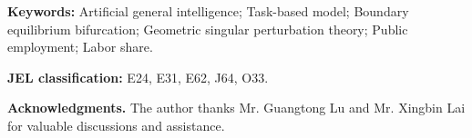 \documentclass[11pt]{article}
\begin{document}
\noindent\textbf{Keywords:} Artificial general intelligence; Task-based model;
Boundary equilibrium bifurcation; Geometric singular perturbation theory;
Public employment; Labor share.

\noindent\textbf{JEL classification:} E24, E31, E62, J64, O33.

\noindent\textbf{Acknowledgments.} The author thanks Mr. Guangtong Lu and
Mr. Xingbin Lai for valuable discussions and assistance.
\end{document}
